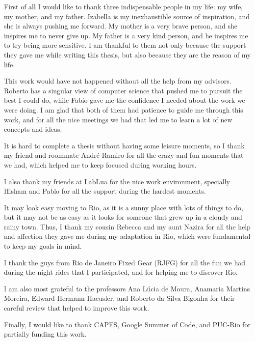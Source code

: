 First of all I would like to thank three indispensable people in my life:
my wife, my mother, and my father.
Izabella is my inexhaustible source of inspiration, and she is
always pushing me forward.
My mother is a very brave person, and she inspires me to never give up.
My father is a very kind person, and he inspires me to try being more sensitive.
I am thankful to them not only because the support they gave me while
writing this thesis, but also because they are the reason of my life.

This work would have not happened without all the help from my advisors.
Roberto has a singular view of computer science that pushed me to
pursuit the best I could do, while Fabio gave me the confidence I
needed about the work we were doing.
I am glad that both of them had patience to guide me through this
work, and for all the nice meetings we had that led me to learn
a lot of new concepts and ideas.

It is hard to complete a thesis without having some leisure moments,
so I thank my friend and roommate André Ramiro for all the crazy and
fun moments that we had, which helped me to keep focused during working hours.

I also thank my friends at LabLua for the nice work environment,
specially Hisham and Pablo for all the support during the
hardest moments.

It may look easy moving to Rio, as it is a sunny place with lots
of things to do, but it may not be as easy as it looks for
someone that grew up in a cloudy and rainy town.
Thus, I thank my cousin Rebecca and my aunt Nazira for all the help
and affection they gave me during my adaptation in Rio, which
were fundamental to keep my goals in mind.

I thank the guys from Rio de Janeiro Fixed Gear (RJFG) for all
the fun we had during the night rides that I participated,
and for helping me to discover Rio.

I am also most grateful to the professors Ana Lúcia de Moura,
Anamaria Martins Moreira, Edward Hermann Haeusler, and
Roberto da Silva Bigonha for their careful review that helped
to improve this work.

Finally, I would like to thank CAPES, Google Summer of Code, and PUC-Rio
for partially funding this work.
